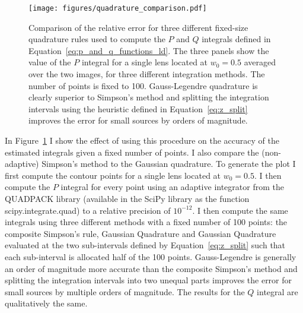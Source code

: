 \documentclass[12pt,dvipsnames]{report}
\newcommand{\ssf}[1]{\textsf{#1}}
\begin{document}
\begin{figure}[t]
    \begin{centering}
        \texttt{[image: figures/quadrature\_comparison.pdf]}
        \caption{Comparison of the relative error for three different fixed-size quadrature rules 
        used to compute the $P$ and $Q$ integrals defined in 
        Equation~\ref{eq:p_and_q_functions_ld}. The three panels show the value of the $P$ integral 
        for a single lens located at $w_0=0.5$ averaged 
        over the two images, for three different integration methods. The number of points 
        is fixed to 100. Gauss-Legendre quadrature is clearly superior to Simpson's method
        and splitting the integration intervals using the heuristic defined in 
        Equation~\ref{eq:z_split} improves the error for small sources by orders of magnitude.}
        \label{fig:quadrature_comparison}
    \end{centering}
\end{figure}

In Figure~\ref{fig:quadrature_comparison} I show the effect of using this procedure on the 
accuracy of the estimated integrals given a fixed number of points. I also compare the 
(non-adaptive) Simpson's method to the Gaussian quadrature.
To generate the plot I first compute the contour points 
for a single lens located at $w_0=0.5$. I then compute the $P$ integral for every point 
using an adaptive integrator from the \ssf{QUADPACK} library (available in the \ssf{SciPy} library as 
the function \ssf{scipy.integrate.quad}) to a relative precision of $10^{-12}$. I then compute
the same integrals using three different methods with a fixed number of 100 points: the composite 
Simpson's rule, Gaussian Quadrature and Gaussian Quadrature evaluated at the two sub-intervals
defined by Equation~\ref{eq:z_split} such that each sub-interval is allocated half of the 100 
points. Gauss-Legendre is generally an order of  magnitude more accurate than the composite Simpson's 
method and splitting the integration intervals into two unequal parts improves the error 
for small  sources by multiple orders of magnitude.
The results for the $Q$ integral are qualitatively the same. 
\end{document}
